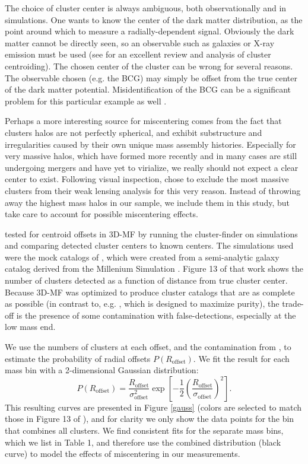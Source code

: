 The choice of cluster center is always ambiguous, both observationally and in simulations. One wants to know the center of the dark matter distribution, as the point around which to measure a radially-dependent signal. Obviously the dark matter cannot be directly seen, so an observable such as galaxies or X-ray emission must be used (see \citet{George12} for an excellent review and analysis of cluster centroiding). The chosen center of the cluster can be wrong for several reasons. The observable chosen (e.g. the BCG) may simply be offset from the true center of the dark matter potential. Misidentification of the BCG can be a significant problem for this particular example as well \citep{Johnston07}. 

Perhaps a more interesting source for miscentering comes from the fact that clusters halos are not perfectly spherical, and exhibit substructure and irregularities caused by their own unique mass assembly histories. Especially for very massive halos, which have formed more recently and in many cases are still undergoing mergers and have yet to virialize, we really should not expect a clear center to exist. Following visual inspection, \citet{Mandelbaum08b} chose to exclude the most massive clusters from their weak lensing analysis for this very reason. Instead of throwing away the highest mass halos in our sample, we include them in this study, but take care to account for possible miscentering effects. 

\citet{Milkeraitis10} tested for centroid offsets in \ac{3D-MF} by running the cluster-finder on simulations and comparing detected cluster centers to known centers. The simulations used were the mock catalogs of \citet{KW07}, which were created from a semi-analytic galaxy catalog \citep{DeLucia07} derived from the Millenium Simulation \citep{Springel05}. Figure 13 of that work shows the number of clusters detected as a function of distance from true cluster center. Because \ac{3D-MF} was optimized to produce cluster catalogs that are as complete as possible (in contrast to, e.g. \citet{Gillis11}, which is designed to maximize purity), the trade-off is the presence of some contamination with false-detections, especially at the low mass end.

We use the numbers of clusters at each offset, and the contamination from \citet{Milkeraitis10}, to estimate the probability of radial offsets $P(R_{\mathrm{offset}})$. We fit the result for each mass bin with a 2-dimensional Gaussian distribution:
\begin{equation}
P(R_{\mathrm{offset}}) = \frac{R_{\mathrm{offset}}}{\sigma_{\mathrm{offset}}^2} \exp \left[ -\frac{1}{2}\left( \frac{R_{\mathrm{offset}}}{\sigma_{\mathrm{offset}}} \right)^2 \right].
\label{PofRc}
\end{equation}
This resulting curves are presented in Figure \ref{gauss} (colors are selected to match those in Figure 13 of \citet{Milkeraitis10}), and for clarity we only show the data points for the bin that combines all clusters. We find consistent fits for the separate mass bins, which we list in Table 1, and therefore use the combined distribution (black curve) to model the effects of miscentering in our measurements.



